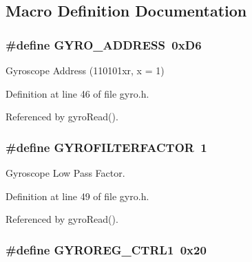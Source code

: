 \subsection{Macro Definition Documentation}
\hypertarget{group__gyro_ga8ed1f343e82440b4ef900e5fe42d74f0}{
\subsubsection[{G\-Y\-R\-O\-\_\-\-A\-D\-D\-R\-E\-S\-S}]{\setlength{\rightskip}{0pt plus 5cm}\#define G\-Y\-R\-O\-\_\-\-A\-D\-D\-R\-E\-S\-S~0x\-D6}}\label{group__gyro_ga8ed1f343e82440b4ef900e5fe42d74f0}


Gyroscope Address (110101xr, x = 1) 



Definition at line 46 of file gyro.\-h.



Referenced by gyro\-Read().

\hypertarget{group__gyro_ga1b5d47810976ecbfd688513246db3ba9}{
\subsubsection[{G\-Y\-R\-O\-F\-I\-L\-T\-E\-R\-F\-A\-C\-T\-O\-R}]{\setlength{\rightskip}{0pt plus 5cm}\#define G\-Y\-R\-O\-F\-I\-L\-T\-E\-R\-F\-A\-C\-T\-O\-R~1}}\label{group__gyro_ga1b5d47810976ecbfd688513246db3ba9}


Gyroscope Low Pass Factor. 



Definition at line 49 of file gyro.\-h.



Referenced by gyro\-Read().

\hypertarget{group__gyro_ga59d5eec860eab49733b4a814731e356c}{
\subsubsection[{G\-Y\-R\-O\-R\-E\-G\-\_\-\-C\-T\-R\-L1}]{\setlength{\rightskip}{0pt plus 5cm}\#define G\-Y\-R\-O\-R\-E\-G\-\_\-\-C\-T\-R\-L1~0x20}}\label{group__gyro_ga59d5eec860eab49733b4a814731e356c}


